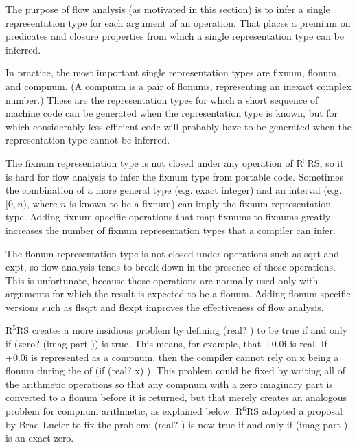 \documentclass[twoside,twocolumn]{algol60}
\newcommand{\rn}[1]{R$^{#1}$RS}
\begin{document}
The purpose of flow analysis (as motivated in this section) is to infer a
single representation type for each argument of an operation.  That
places a premium on predicates and closure properties from which a
single representation type can be inferred.

In practice, the most important single representation types are
fixnum, flonum, and compnum.  (A compnum is a pair of flonums,
representing an inexact complex number.)  These are the representation
types for which a short sequence of machine code can be generated when
the representation type is known, but for which considerably less
efficient code will probably have to be generated when the
representation type cannot be inferred.

The fixnum representation type is not closed under any operation of
\rn{5}, so it is hard for flow analysis to infer the fixnum type from
portable code.  Sometimes the combination of a more general type (e.g.
exact integer) and an interval (e.g.  $[0,n)$, where $n$ is known to
be a fixnum) can imply the fixnum representation type.  Adding
fixnum-specific operations that map fixnums to fixnums 
greatly increases the number of fixnum
representation types that a compiler can infer.

The flonum representation type is not closed under operations such as
{\cf sqrt} and {\cf expt}, so flow analysis tends to break down in the
presence of those operations.  This is unfortunate, because those
operations are normally used only with arguments for which the result
is expected to be a flonum.  Adding flonum-specific versions such as
{\cf flsqrt} and {\cf flexpt} improves the effectiveness of flow
analysis.

\rn{5} creates a more insidious problem by defining {\cf (real?
  )} to be true if and only if {\cf (zero? (imag-part
  ))} is true.  This means, for example, that {+0.0i}
is real.  If {+0.0i} is represented as a compnum, then the
compiler cannot rely on x being a flonum during the 
of {\cf (if (real? x)  )}.  This
problem could be fixed by writing all of the arithmetic operations so
that any compnum with a zero imaginary part is converted to a flonum
before it is returned, but that merely creates an analogous problem
for compnum arithmetic, as explained below.  \rn{6} adopted a proposal
by Brad Lucier to fix the problem: {\cf (real? )} is now true
if and only if {\cf (imag-part )} is an exact zero.
\end{document}
